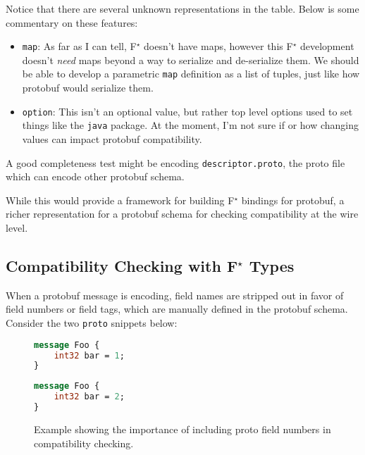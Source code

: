 \documentclass[11pt]{article}
\newcommand{\fstar}{F\(^\star\)}
\theoremstyle{definition}
\begin{document}
Notice that there are several unknown representations in the table. Below is
some commentary on these features:

\begin{itemize}
	\item \texttt{map}: As far as I can tell, \fstar{} doesn't have maps, however
	      this \fstar{} development doesn't \emph{need} maps beyond a way to serialize
	      and de-serialize them. We should be able to develop a parametric
	      \texttt{map} definition as a list of tuples, just like how protobuf would
	      serialize them.
	\item \texttt{option}: This isn't an optional value, but rather top level
	      options used to set things like the \texttt{java} package. At the moment,
	      I'm not sure if or how changing values can impact protobuf compatibility.
\end{itemize}

A good completeness test might be encoding \texttt{descriptor.proto}, the proto
file which can encode other protobuf schema.

While this would provide a framework for building \fstar{} bindings for
protobuf, a richer representation for a protobuf schema for checking
compatibility at the wire level.

\subsection{Compatibility Checking with \fstar{} Types}

When a protobuf message is encoding, field names are stripped out in favor of
field numbers or field tags, which are manually defined in the protobuf
schema. Consider the two \texttt{proto} snippets below:

\begin{figure}[H]
	\centering
	\begin{minipage}[bt]{0.4\textwidth}
		\begin{lstlisting}[language=proto]
message Foo {
    int32 bar = 1;
}\end{lstlisting}
	\end{minipage}
	\hspace{1cm}
	\begin{minipage}[bt]{0.4\textwidth}
		\begin{lstlisting}[language=proto]
message Foo {
    int32 bar = 2;
}\end{lstlisting}
	\end{minipage}

	\caption[]{Example showing the importance of including proto field numbers in
		compatibility checking.}
\end{figure}
\end{document}
